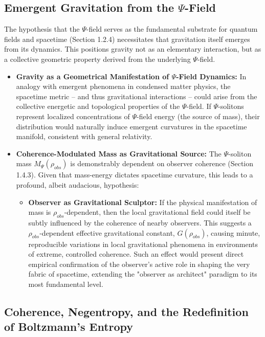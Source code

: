\documentclass{report}
\begin{document}
\subsection{Emergent Gravitation from the $\Psi$-Field}
\label{subsec:gravity}

The hypothesis that the $\Psi$-field serves as the fundamental substrate for quantum fields and spacetime (Section 1.2.4) necessitates that gravitation itself emerges from its dynamics. This positions gravity not as an elementary interaction, but as a collective geometric property derived from the underlying $\Psi$-field.

\begin{itemize}
    \item \textbf{Gravity as a Geometrical Manifestation of $\Psi$-Field Dynamics:} In analogy with emergent phenomena in condensed matter physics, the spacetime metric -- and thus gravitational interactions -- could arise from the collective energetic and topological properties of the $\Psi$-field. If $\Psi$-solitons represent localized concentrations of $\Psi$-field energy (the source of mass), their distribution would naturally induce emergent curvatures in the spacetime manifold, consistent with general relativity.
    \item \textbf{Coherence-Modulated Mass as Gravitational Source:} The $\Psi$-soliton mass $M_\Psi(\rho_{obs})$ is demonstrably dependent on observer coherence (Section 1.4.3). Given that mass-energy dictates spacetime curvature, this leads to a profound, albeit audacious, hypothesis:
    \begin{itemize}
        \item \textbf{Observer as Gravitational Sculptor:} If the physical manifestation of mass is $\rho_{obs}$-dependent, then the local gravitational field could itself be subtly influenced by the coherence of nearby observers. This suggests a $\rho_{obs}$-dependent effective gravitational constant, $G(\rho_{obs})$, causing minute, reproducible variations in local gravitational phenomena in environments of extreme, controlled coherence. Such an effect would present direct empirical confirmation of the observer's active role in shaping the very fabric of spacetime, extending the "observer as architect" paradigm to its most fundamental level.
    \end{itemize}
\end{itemize}

\subsection{Coherence, Negentropy, and the Redefinition of Boltzmann's Entropy}
\label{subsec:entropy}
\end{document}
